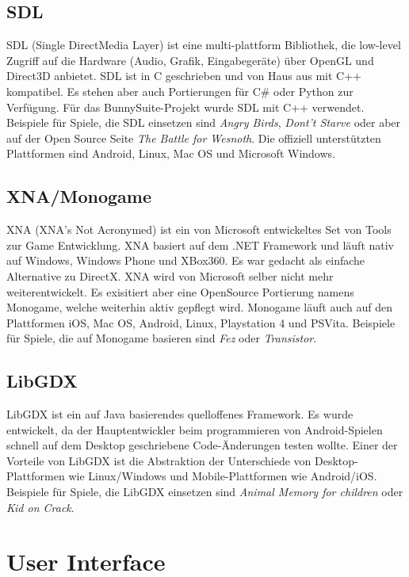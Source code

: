 \subsection{SDL}
SDL (Single DirectMedia Layer) ist eine multi-plattform Bibliothek, die low-level Zugriff auf die Hardware (Audio, Grafik, Eingabegeräte) über OpenGL und Direct3D anbietet. SDL ist in C geschrieben und von Haus aus mit C++ kompatibel. Es stehen aber auch Portierungen für C\# oder Python zur Verfügung. Für das BunnySuite-Projekt wurde SDL mit C++ verwendet. Beispiele für Spiele, die SDL einsetzen sind \emph{Angry Birds}, \emph{Dont't Starve} oder aber auf der Open Source Seite \emph{The Battle for Wesnoth}. Die offiziell unterstützten Plattformen sind Android, Linux, Mac OS und Microsoft Windows.

\subsection{XNA/Monogame}
XNA (XNA's Not Acronymed) ist ein von Microsoft entwickeltes Set von Tools zur Game Entwicklung. XNA basiert auf dem .NET Framework und läuft nativ auf Windows, Windows Phone und XBox360. Es war gedacht als einfache Alternative zu DirectX. XNA wird von Microsoft selber nicht mehr weiterentwickelt. Es exisitiert aber eine OpenSource Portierung namens Monogame, welche weiterhin aktiv gepflegt wird. Monogame läuft auch auf den Plattformen iOS, Mac OS, Android, Linux, Playstation 4 und PSVita. Beispiele für Spiele, die auf Monogame basieren sind \emph{Fez} oder \emph{Transistor}.

\subsection{LibGDX}
LibGDX ist ein auf Java basierendes quelloffenes Framework. Es wurde entwickelt, da der Hauptentwickler beim programmieren von Android-Spielen schnell auf dem Desktop geschriebene Code-Änderungen testen wollte. Einer der Vorteile von LibGDX ist die Abstraktion der Unterschiede von Desktop-Plattformen wie Linux/Windows und Mobile-Plattformen wie Android/iOS. Beispiele für Spiele, die LibGDX einsetzen sind \emph{Animal Memory for children} oder \emph{Kid on Crack}.

\section{User Interface}
